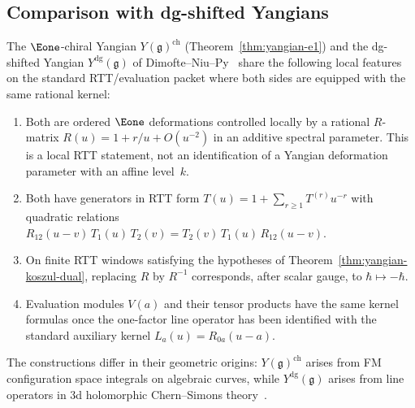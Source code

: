 \subsection{Comparison with dg-shifted Yangians}
\label{sec:dg-shifted-comparison}

\begin{proposition}
\label{prop:dg-shifted-comparison}
The $\Eone$-chiral Yangian
$Y(\mathfrak{g})^{\mathrm{ch}}$
\textup{(}Theorem~\textup{\ref{thm:yangian-e1})}
and the dg-shifted Yangian
$Y^{\mathrm{dg}}(\mathfrak{g})$
of Dimofte--Niu--Py~\textup{\cite{DNP25}}
share the following local features on the standard RTT/evaluation
packet where both sides are equipped with the same rational kernel:
\begin{enumerate}[label=\textup{(\roman*)}]
\item Both are ordered $\Eone$ deformations controlled locally by a
 rational $R$-matrix $R(u)=1+r/u+O(u^{-2})$ in an additive spectral
 parameter.  This is a local RTT statement, not an identification of
 a Yangian deformation parameter with an affine level~$k$.
\item Both have generators in RTT form
 $T(u) = 1 + \sum_{r \geq 1} T^{(r)} u^{-r}$
 with quadratic relations
 $R_{12}(u{-}v)\,T_1(u)\,T_2(v) = T_2(v)\,T_1(u)\,R_{12}(u{-}v)$.
\item On finite RTT windows satisfying the hypotheses of
 Theorem~\ref{thm:yangian-koszul-dual}, replacing $R$ by $R^{-1}$
 corresponds, after scalar gauge, to $\hbar\mapsto-\hbar$.
\item Evaluation modules $V(a)$ and their tensor products have the
 same kernel formulas once the one-factor line operator has been
 identified with the standard auxiliary kernel
 $L_a(u)=R_{0a}(u-a)$.
\end{enumerate}
The constructions differ in their geometric origins:
$Y(\mathfrak{g})^{\mathrm{ch}}$ arises from FM configuration
space integrals on algebraic curves, while
$Y^{\mathrm{dg}}(\mathfrak{g})$ arises from line operators
in 3d holomorphic Chern--Simons theory~\textup{\cite{DNP25}}.
\end{proposition}

